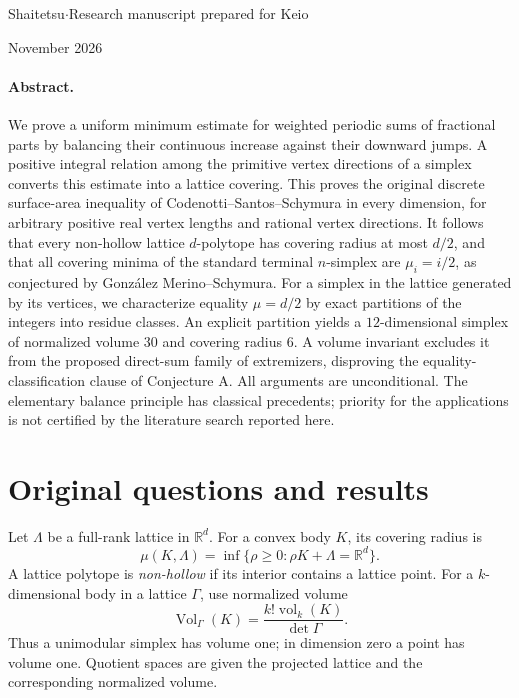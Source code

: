 \documentclass[11pt,a4paper]{article}
\theoremstyle{definition}\newtheorem{definition}[theorem]{Definition}
\theoremstyle{remark}\newtheorem{remark}[theorem]{Remark}
\DeclareMathOperator{\Vol}{Vol}
\DeclareMathOperator{\vol}{vol}
\newcommand{\R}{\mathbb R}\newcommand{\Z}{\mathbb Z}
\begin{document}
\par\vspace{3mm}
\medskip
{}\par
\medskip\noindent Shaitetsu\quad$\cdot$\quad Research manuscript prepared for Keio\par
{} November 2026\par

\paragraph{Abstract.}
We prove a uniform minimum estimate for weighted periodic sums of
fractional parts by balancing their continuous increase against their
downward jumps. A positive integral relation among the primitive vertex
directions of a simplex converts this estimate into a lattice covering.
This proves the original discrete surface-area inequality of
Codenotti--Santos--Schymura in every dimension, for arbitrary positive
real vertex lengths and rational vertex directions. It follows that
every non-hollow lattice $d$-polytope has covering radius at most $d/2$,
and that all covering minima of the standard terminal $n$-simplex are
$\mu_i=i/2$, as conjectured by Gonz\'alez Merino--Schymura.
For a simplex in the lattice generated by its vertices, we characterize
equality $\mu=d/2$ by exact partitions of the integers into residue
classes. An explicit partition yields a $12$-dimensional simplex of
normalized volume $30$ and covering radius $6$. A volume invariant
excludes it from the proposed direct-sum family of extremizers,
disproving the equality-classification clause of Conjecture A.
All arguments are unconditional. The elementary balance principle has
classical precedents; priority for the applications is not certified
by the literature search reported here.

\section{Original questions and results}
\label{sec:intro}
Let $\Lambda$ be a full-rank lattice in $\R^d$. For a convex body $K$,
its covering radius is
\[
 \mu(K,\Lambda)=\inf\{\rho\ge0:\rho K+\Lambda=\R^d\}.
\]
A lattice polytope is \emph{non-hollow} if its interior contains a
lattice point. For a $k$-dimensional body in a lattice $\Gamma$, use
normalized volume
\[
 \Vol_\Gamma(K)=\frac{k!\vol_k(K)}{\det\Gamma}.
\]
Thus a unimodular simplex has volume one; in dimension zero a point
has volume one. Quotient spaces are given the projected lattice and
the corresponding normalized volume.
\end{document}
